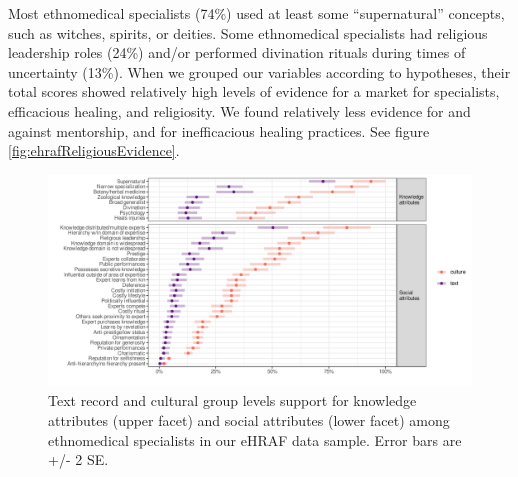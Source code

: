 \documentclass[
  11pt,
]{article}
\begin{document}
Most ethnomedical specialists (74\%) used at least some ``supernatural'' concepts, such as witches, spirits, or deities. Some ethnomedical specialists had religious leadership roles (24\%) and/or performed divination rituals during times of uncertainty (13\%). When we grouped our variables according to hypotheses, their total scores showed relatively high levels of evidence for a market for specialists, efficacious healing, and religiosity. We found relatively less evidence for and against mentorship, and for inefficacious healing practices. See figure \ref{fig:ehrafReligiousEvidence}.

\begin{figure}[p]

{\centering \includegraphics{magic-healers-article2_files/figure-latex/ehrafTotalEvidence-1} 

}

\caption{Text record and cultural group levels support for knowledge attributes (upper facet) and social attributes (lower facet) among ethnomedical specialists in our eHRAF data sample. Error bars are +/- 2 SE.}\label{fig:ehrafTotalEvidence}
\end{figure}
\end{document}
